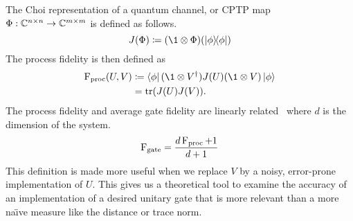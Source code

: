 The Choi representation of a quantum channel, or \ac{CPTP} map $\Phi: \mathbb{C}^{n\times n} \to \mathbb{C}^{m \times m}$ is defined as follows.
\begin{equation}
    J(\Phi) \defeq \qty(\1 \otimes \Phi)(\ketbra{\phi})
\end{equation}
The process fidelity is then defined as
\begin{align}
    \Fid_\text{proc}(U, V) & \defeq \bra{\phi}(\1 \otimes V^\dagger)J(U)(\1 \otimes V)\ket{\phi} \\
                           & = \tr(J(U)J(V)).
\end{align}
The process fidelity and average gate fidelity are linearly related~\cite{fidelity-relation} where $d$ is the dimension of the system.
\begin{equation}
    \operatorname{F}_\text{gate} = \frac{d\operatorname{F}_\text{proc} + 1}{d + 1}
\end{equation}
This definition is made more useful when we replace $V$ by a noisy, error-prone implementation of $U$.
This gives us a theoretical tool to examine the accuracy of an implementation of a desired unitary gate that is more relevant than a more na\"{\i}ve measure like the distance or trace norm.
